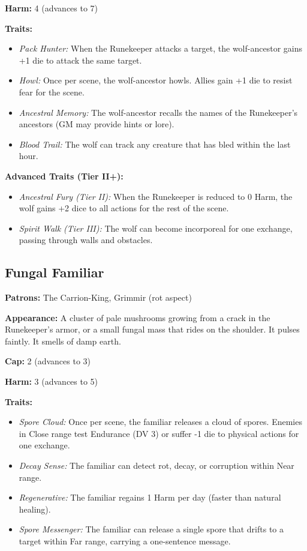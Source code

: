 \noindent\textbf{Harm:} 4 (advances to 7)

\noindent\textbf{Traits:}

\begin{itemize}
\item \textit{Pack Hunter:} When the Runekeeper attacks a target, the wolf-ancestor gains +1 die to attack the same target.
\item \textit{Howl:} Once per scene, the wolf-ancestor howls. Allies gain +1 die to resist fear for the scene.
\item \textit{Ancestral Memory:} The wolf-ancestor recalls the names of the Runekeeper's ancestors (GM may provide hints or lore).
\item \textit{Blood Trail:} The wolf can track any creature that has bled within the last hour.
\end{itemize}

\noindent\textbf{Advanced Traits (Tier II+):}
\begin{itemize}
\item \textit{Ancestral Fury (Tier II):} When the Runekeeper is reduced to 0 Harm, the wolf gains +2 dice to all actions for the rest of the scene.
\item \textit{Spirit Walk (Tier III):} The wolf can become incorporeal for one exchange, passing through walls and obstacles.
\end{itemize}

\subsection{Fungal Familiar}

\noindent\textbf{Patrons:} The Carrion-King, Grimmir (rot aspect)

\noindent\textbf{Appearance:} A cluster of pale mushrooms growing from a crack in the Runekeeper's armor, or a small fungal mass that rides on the shoulder. It pulses faintly. It smells of damp earth.

\noindent\textbf{Cap:} 2 (advances to 3)

\noindent\textbf{Harm:} 3 (advances to 5)

\noindent\textbf{Traits:}

\begin{itemize}
\item \textit{Spore Cloud:} Once per scene, the familiar releases a cloud of spores. Enemies in Close range test Endurance (DV 3) or suffer -1 die to physical actions for one exchange.
\item \textit{Decay Sense:} The familiar can detect rot, decay, or corruption within Near range.
\item \textit{Regenerative:} The familiar regains 1 Harm per day (faster than natural healing).
\item \textit{Spore Messenger:} The familiar can release a single spore that drifts to a target within Far range, carrying a one-sentence message.
\end{itemize}


